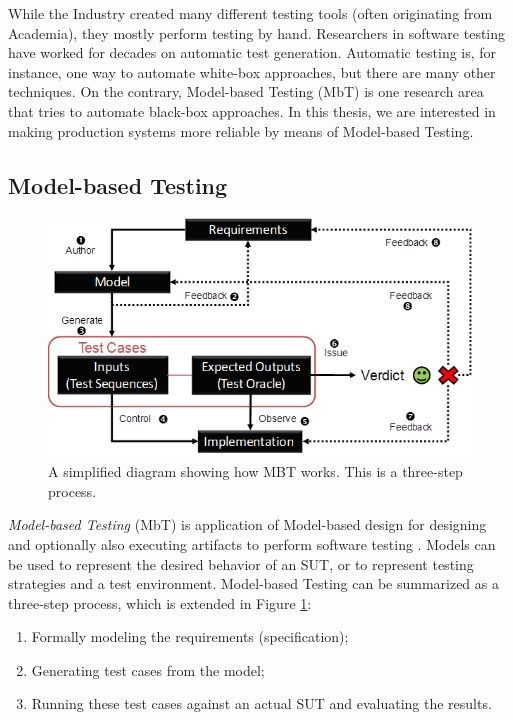 While the Industry created many different testing tools (often
originating from Academia), they mostly perform testing by hand.
Researchers in software testing have worked for decades on
automatic test generation. Automatic testing is, for instance,
one way to automate white-box approaches, but there are many
other techniques. On the contrary, Model-based Testing (MbT) is
one research area that tries to automate black-box approaches.
In this thesis, we are interested in making production systems
more reliable by means of Model-based Testing.

\subsection{Model-based Testing}
\label{sec:related:testing:mbt}

\begin{figure}[ht]
    \begin{center}
    \includegraphics[width=1.0\linewidth]{figures/mbt.png}
    \end{center}

    \caption{A simplified diagram showing how MBT works. This is
    a three-step process.}
    \label{fig:mbt}
\end{figure}

\textit{Model-based Testing} (MbT) is application of Model-based
design for designing and optionally also executing artifacts to
perform software testing \cite{Jorgensen:1995:STC:526521}.
Models can be used to represent the desired behavior of an SUT,
or to represent testing strategies and a test environment.
Model-based Testing can be summarized as a three-step process,
which is extended in Figure \ref{fig:mbt}:

\begin{enumerate}
\item Formally modeling the requirements (specification);

\item Generating test cases from the model;

\item Running these test cases against an actual SUT and
evaluating the results.
\end{enumerate}

